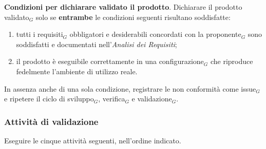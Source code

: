 \documentclass[a4paper, 10pt]{article}
\begin{document}
\noindent \textbf{Condizioni per dichiarare validato il prodotto}. Dichiarare il prodotto validato$_G$ solo se \textbf{entrambe} le condizioni seguenti risultano soddisfatte:
\begin{enumerate}
    \item tutti i requisiti$_G$ obbligatori e desiderabili concordati con la proponente$_G$ sono soddisfatti e documentati nell'\emph{Analisi dei Requisiti};
    \item il prodotto è eseguibile correttamente in una configurazione$_G$ che riproduce fedelmente l'ambiente di utilizzo reale.
\end{enumerate}

\noindent In assenza anche di una sola condizione, registrare le non conformità come issue$_G$ e ripetere il ciclo di sviluppo$_G$, verifica$_G$ e validazione$_G$.

\subsubsection{Attività di validazione}
\label{subsec:attivita_validazione}

Eseguire le cinque attività seguenti, nell'ordine indicato.
\end{document}
